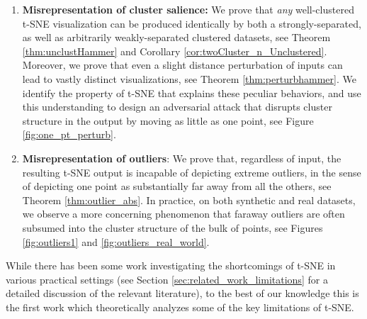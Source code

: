 


\begin{enumerate}[label=(\roman*)]
    \item \textbf{Misrepresentation of cluster salience:} We prove that \emph{any} well-clustered t-SNE visualization can be produced identically by both %
    a strongly-separated, as well as  arbitrarily weakly-separated clustered datasets, 
    see Theorem \ref{thm:unclustHammer} and Corollary \ref{cor:twoCluster_n_Unclustered}. %
    Moreover, we prove that even a slight distance perturbation of inputs %
    can lead to vastly distinct visualizations, see Theorem \ref{thm:perturbhammer}. We identify the property of t-SNE that explains these peculiar behaviors, and use this understanding to design an adversarial attack that disrupts cluster structure in the output by moving as little as one point, see Figure \ref{fig:one_pt_perturb}.
\pagebreak
    \item \textbf{Misrepresentation of outliers}: We prove that, regardless of input, %
    the resulting t-SNE output is incapable of depicting extreme outliers, in the sense of depicting one point as substantially far away from all the others, see Theorem \ref{thm:outlier_abs}. In practice, on both synthetic and real datasets, we observe a more concerning phenomenon that faraway outliers are often subsumed into the cluster structure of the bulk of points, see Figures \ref{fig:outliers1} and \ref{fig:outliers_real_world}. %
\end{enumerate}


While there has been some work investigating the shortcomings of t-SNE in various practical settings (see Section \ref{sec:related_work_limitations} for a detailed discussion of the relevant literature), to the best of our knowledge this is the first work which theoretically analyzes some of the key limitations of t-SNE. 

